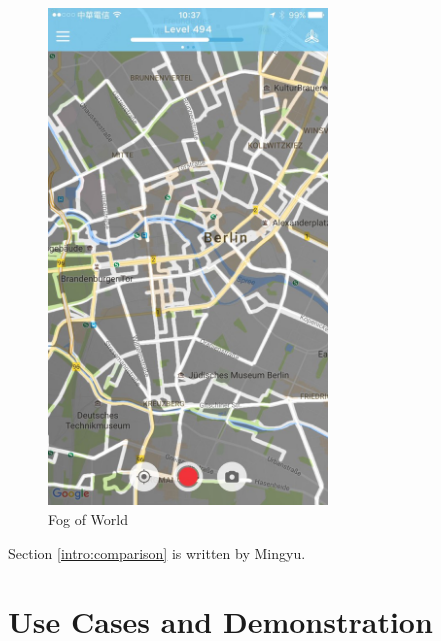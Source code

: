 \documentclass[12pt,a4paper]{article}
\begin{document}
\begin{figure}
\begin{minipage}{.5\textwidth}
                    \includegraphics[width=0.66\textwidth]{1-3-3}
                    \centering
                    \caption{Fog of World}
                    \label{fig:fog-of-world}
                \end{minipage}
            \end{figure}
        
        \footnotesize
            Section \ref{intro:comparison} is written by Mingyu.
        \normalsize
    
    \clearpage
    
    
    \section{Use Cases and Demonstration}
\end{document}
